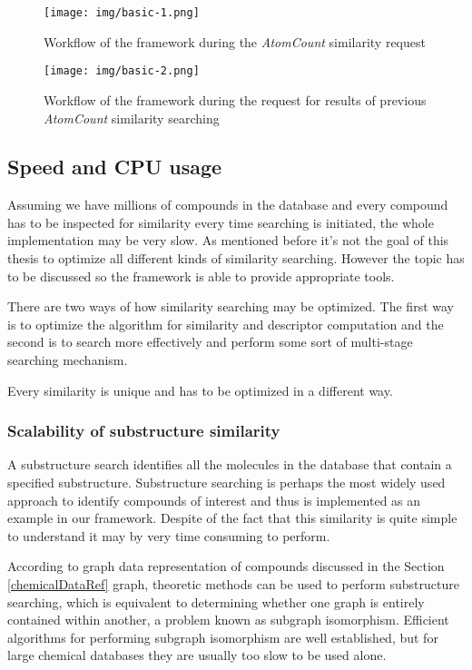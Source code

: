 \documentclass[thesis=M,english]{FITthesis}[2012/10/20]
\begin{document}
\begin{figure}
  \centering
  \texttt{[image: img/basic-1.png]}
  \caption{Workflow of the framework during the \textit{AtomCount} similarity request}
  \label{fig:basic-1}
\end{figure}

\begin{figure}
  \centering
  \texttt{[image: img/basic-2.png]}
  \caption{Workflow of the framework during the request for results of previous \textit{AtomCount} similarity searching}
  \label{fig:basic-2}
\end{figure}


\subsection{Speed and CPU usage}
Assuming we have millions of compounds in the database and every compound has to be inspected for similarity every time searching is initiated, the whole implementation may be very slow. As mentioned before it’s not the goal of this thesis to optimize all different kinds of similarity searching. However the topic has to be discussed so the framework is able to provide appropriate tools.

There are two ways of how similarity searching may be optimized. The first way is to optimize the algorithm for similarity and descriptor computation and the second is to search more effectively and perform some sort of multi-stage searching mechanism.

Every similarity is unique and has to be optimized in a different way.

\subsubsection{Scalability of substructure similarity}
A substructure search identifies all the molecules in the database that contain a specified substructure. Substructure searching is perhaps the most widely used approach to identify compounds of interest and thus is implemented as an example in our framework. Despite of the fact that this similarity is quite simple to understand it may by very time consuming to perform.

According to graph data representation of compounds discussed in the Section \ref{chemicalDataRef} graph, theoretic methods can be used to perform substructure searching, which is equivalent to determining whether one graph is entirely contained within another, a problem known as subgraph isomorphism. Efficient algorithms for performing subgraph isomorphism are well established, but for large chemical databases they are usually too slow to be used alone. 
\end{document}
